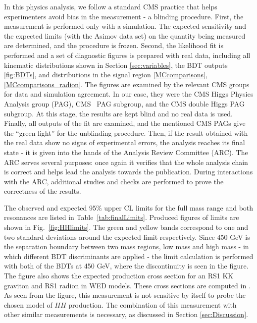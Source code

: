 In this physics analysis, we follow a standard CMS practice that helps experimenters avoid bias in the measurement - a blinding procedure. First, the measurement is performed only with a simulation. The expected sensitivity and the expected limits (with the Asimov data set) on the quantity being measured are determined, and the procedure is frozen. Second, the likelihood fit is performed and a set of diagnostic figures is prepared with real data, including all kinematic distributions shown in Section \ref{sec:variables}, the BDT outputs \ref{fig:BDTs}, and \mTHH distributions in the signal region \ref{MCcomparisons}, \ref{MCcomparisons_radion}. The figures are examined by the relevant CMS groups for data and simulation agreement. In our case, they were the CMS Higgs Physics Analysis group (PAG), CMS \HZZ~PAG subgroup, and the CMS double Higgs PAG subgroup. At this stage, the results are kept blind and no real data is used. Finally, all outputs of the fit are examined, and the mentioned CMS PAGs give the ``green light'' for the unblinding procedure. Then, if the result obtained with the real data show no signs of experimental errors, the analysis reaches its final state - it is given into the hands of the Analysis Review Committee (ARC). The ARC serves several purposes: once again it verifies that the whole analysis chain is correct and helps lead the analysis towards the publication. During interactions with the ARC, additional studies and checks are performed to prove the correctness of the results. 

The observed and expected 95\% upper CL limits for the full mass range and both resonances are listed in Table~\ref{tab:finalLimits}. Produced figures of limits are shown in Fig.~\ref{fig:HHlimits}. The green and yellow bands correspond to one and two standard deviations around the expected limit respectively. Since 450 GeV is the separation boundary between two mass regions, low mass and high mass - in which different BDT discriminants are applied - the limit calculation is performed with both of the BDTs at 450 GeV, where the discontinuity is
seen in the figure. The figure also shows the expected production cross section for an RS1 KK graviton and RS1 radion in WED models. These cross sections are computed in \cite{Oliveira:2014kla}. As seen from the figure, this measurement is not sensitive by itself to probe the chosen model of $HH$ production. The combination of this measurement with other similar measurements is necessary, as discussed in Section \ref{sec:Discussion}.

